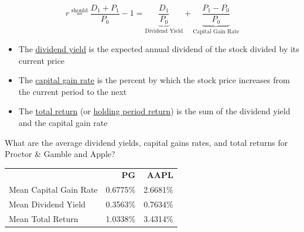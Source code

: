 \documentclass{beamer}
\newcommand{\should}{\overset{\text{should}}{=}}
\begin{document}
\begin{frame}{}
\begin{equation*}
	r\should\frac{D_{1}+P_{1}}{P_{0}}-1=\underbrace{\frac{D_{1}}{P_{0}}}_{\text{Dividend Yield}}+\underbrace{\frac{P_{1}-P_{0}}{P_{0}}}_{\text{Capital Gain Rate}}
\end{equation*}
\begin{itemize}
\item The \underline{dividend yield} is the expected annual dividend of the stock divided by its current price 
\item The \underline{capital gain rate} is the percent by which the stock price increases from the current period to the next
\item The \underline{total return} (or \underline{holding period return}) is the sum of the dividend yield and the capital gain rate  
\end{itemize}
\end{frame}

\begin{frame}{}
	What are the average dividend yields, capital gains rates, and total returns for Proctor \& Gamble and Apple?
	\pause
	{\color{blue}
\begin{table}[H]
	\begin{center}
		\begin{tabular}{lrr}
			& \textbf{PG} & \textbf{AAPL} \\ 
			Mean Capital Gain Rate & 0.6775\% & 2.6681\% \\
			Mean Dividend Yield & 0.3563\% & 0.7634\% \\
			Mean Total Return & 1.0338\% & 3.4314\% 
		\end{tabular}
	\end{center}
\end{table}
	}
\end{frame}
\end{document}

